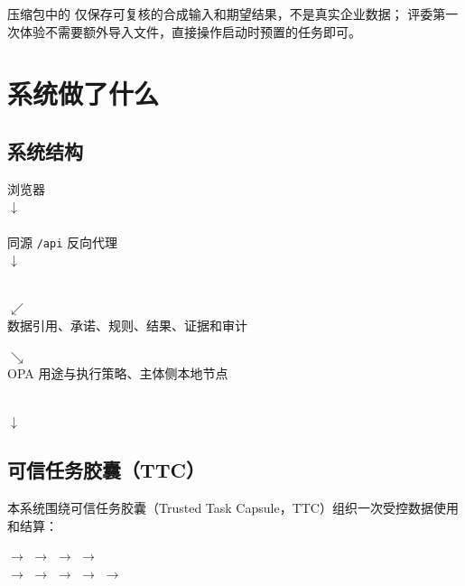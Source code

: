 \documentclass[UTF8,a4paper,zihao=-4,oneside]{ctexart}
\newcommand{\fpath}[1]{\path{#1}}
\begin{document}
压缩包中的 \fpath{demo-data/} 仅保存可复核的合成输入和期望结果，不是真实企业数据；
评委第一次体验不需要额外导入文件，直接操作启动时预置的任务即可。

\section{系统做了什么}

\subsection{系统结构}

\begin{center}
\begin{tcolorbox}[width=0.94\textwidth,colback=CodeBg,colframe=CodeFrame,boxrule=0.5pt,arc=1mm]
\centering
浏览器\\[2pt]
$\downarrow$\\[-1pt]
\\[2pt]
同源 \texttt{/api} 反向代理\\[2pt]
$\downarrow$\\[-1pt]
\\[2pt]
{\small
\begin{minipage}[t]{0.42\linewidth}
  \centering
  $\swarrow$\\[-1pt]
  数据引用、承诺、规则、结果、证据和审计
\end{minipage}\hfill
\begin{minipage}[t]{0.42\linewidth}
  \centering
  $\searrow$\\[-1pt]
  OPA 用途与执行策略、主体侧本地节点
\end{minipage}}\\[3pt]
$\downarrow$\\[-1pt]
\end{tcolorbox}
\end{center}

\subsection{可信任务胶囊（TTC）}

本系统围绕可信任务胶囊（Trusted Task Capsule，TTC）组织一次受控数据使用和结算：

\begin{center}
 $\rightarrow$ 
 $\rightarrow$ 
 $\rightarrow$ 
 $\rightarrow$ \\[5pt]
 $\rightarrow$ 
 $\rightarrow$ 
 $\rightarrow$ 
 $\rightarrow$ 
 $\rightarrow$ 
\end{center}
\end{document}
